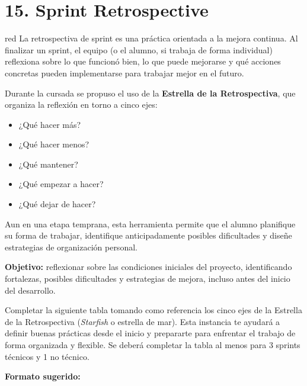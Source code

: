 \section{15. Sprint Retrospective}    
\label{sec:sprint_retro}


\begin{consigna}{red}
La retrospectiva de sprint es una práctica orientada a la mejora continua. Al finalizar un sprint, el equipo (o el alumno, si trabaja de forma individual) reflexiona sobre lo que funcionó bien, lo que puede mejorarse y qué acciones concretas pueden implementarse para trabajar mejor en el futuro.

Durante la cursada se propuso el uso de la \textbf{Estrella de la Retrospectiva}, que organiza la reflexión en torno a cinco ejes:

\begin{itemize}
\item  ¿Qué hacer más?
\item  ¿Qué hacer menos?
\item  ¿Qué mantener?
\item  ¿Qué empezar a hacer?
\item  ¿Qué dejar de hacer?
\end{itemize}

Aun en una etapa temprana, esta herramienta permite que el alumno planifique su forma de trabajar, identifique anticipadamente posibles dificultades y diseñe estrategias de organización personal.

\textbf{Objetivo:} reflexionar sobre las condiciones iniciales del proyecto, identificando fortalezas, posibles dificultades y estrategias de mejora, incluso antes del inicio del desarrollo.


Completar la siguiente tabla tomando como referencia los cinco ejes de la Estrella de la Retrospectiva (\emph{Starfish} o estrella de mar). Esta instancia te ayudará a definir buenas prácticas desde el inicio y prepararte para enfrentar el trabajo de forma organizada y flexible. Se deberá completar la tabla al menos para 3 sprints técnicos y 1 no técnico.

\textbf{Formato sugerido:}


\end{consigna}
